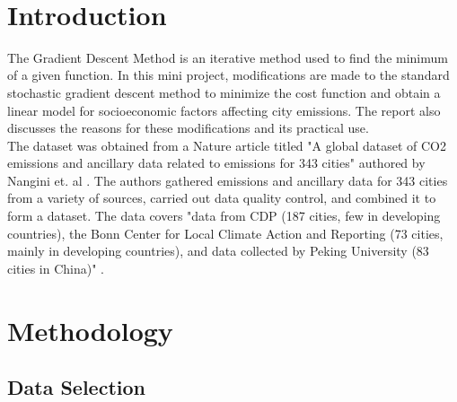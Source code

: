 \documentclass[onecolumn]{article}
\begin{document}
\
{\newpage}
\onecolumn
\maketitle        

\vspace{-5mm}
\section{Introduction}

The Gradient Descent Method is an iterative method used to find the minimum of a given function. In this mini project, modifications are made to the standard stochastic gradient descent method to minimize the cost function and obtain a linear model for socioeconomic factors affecting city emissions. The report also discusses the reasons for these modifications and its practical use.\\ 

The dataset was obtained from a Nature article titled "A global dataset of CO2 emissions and ancillary data related to emissions for 343 cities" authored by Nangini et. al \cite{nangini2019global}. The authors gathered emissions and ancillary data for 343 cities from a variety of sources, carried out data quality control, and combined it to form a dataset. The data covers "data from CDP (187 cities, few in developing countries), the Bonn Center for Local Climate Action and Reporting (73 cities, mainly in developing countries), and data collected by Peking University (83 cities in China)" \cite{nangini2019global}.

\section{Methodology}

\subsection{Data Selection}
\end{document}
